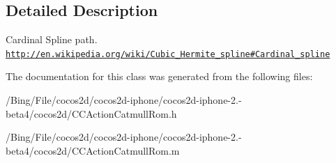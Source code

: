 \subsection{Detailed Description}
Cardinal Spline path. \href{http://en.wikipedia.org/wiki/Cubic_Hermite_spline#Cardinal_spline}{\tt http\-://en.\-wikipedia.\-org/wiki/\-Cubic\-\_\-\-Hermite\-\_\-spline\#\-Cardinal\-\_\-spline} 

The documentation for this class was generated from the following files\-:\begin{DoxyCompactItemize}
\item 
/\-Bing/\-File/cocos2d/cocos2d-\/iphone/cocos2d-\/iphone-\/2.-\/beta4/cocos2d/C\-C\-Action\-Catmull\-Rom.\-h\item 
/\-Bing/\-File/cocos2d/cocos2d-\/iphone/cocos2d-\/iphone-\/2.-\/beta4/cocos2d/C\-C\-Action\-Catmull\-Rom.\-m\end{DoxyCompactItemize}
